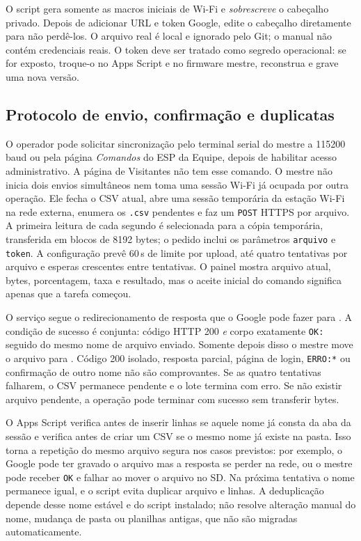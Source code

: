O script  gera somente as macros iniciais de Wi-Fi e \emph{sobrescreve} o cabeçalho privado. Depois de adicionar URL e token Google, edite o cabeçalho diretamente para não perdê-los. O arquivo real é local e ignorado pelo Git; o manual não contém credenciais reais. O token deve ser tratado como segredo operacional: se for exposto, troque-o no Apps Script e no firmware mestre, reconstrua e grave uma nova versão.

\subsection{Protocolo de envio, confirmação e duplicatas}\label{sec:google_fluxo}
O operador pode solicitar sincronização pelo terminal serial do mestre a 115200\,baud ou pela página \emph{Comandos} do ESP da Equipe, depois de habilitar acesso administrativo. A página de Visitantes não tem esse comando. O mestre não inicia dois envios simultâneos nem toma uma sessão Wi-Fi já ocupada por outra operação. Ele fecha o CSV atual, abre uma sessão temporária da estação Wi-Fi na rede externa, enumera os \texttt{.csv} pendentes e faz um \texttt{POST} HTTPS por arquivo. A primeira leitura de cada segundo é selecionada para a cópia temporária, transferida em blocos de 8192 bytes; o pedido inclui os parâmetros \texttt{arquivo} e \texttt{token}. A configuração prevê 60\,s de limite por upload, até quatro tentativas por arquivo e esperas crescentes entre tentativas. O painel mostra arquivo atual, bytes, porcentagem, taxa e resultado, mas o aceite inicial do comando significa apenas que a tarefa começou.

O serviço segue o redirecionamento de resposta que o Google pode fazer para . A condição de sucesso é conjunta: código HTTP 200 \emph{e} corpo exatamente \texttt{OK:} seguido do mesmo nome de arquivo enviado. Somente depois disso o mestre move o arquivo para . Código 200 isolado, resposta parcial, página de login, \texttt{ERRO:*} ou confirmação de outro nome não são comprovantes. Se as quatro tentativas falharem, o CSV permanece pendente e o lote termina com erro. Se não existir arquivo pendente, a operação pode terminar com sucesso sem transferir bytes.

O Apps Script verifica antes de inserir linhas se aquele nome já consta da aba da sessão e verifica antes de criar um CSV se o mesmo nome já existe na pasta. Isso torna a repetição do mesmo arquivo segura nos casos previstos: por exemplo, o Google pode ter gravado o arquivo mas a resposta se perder na rede, ou o mestre pode receber \texttt{OK} e falhar ao mover o arquivo no SD. Na próxima tentativa o nome permanece igual, e o script evita duplicar arquivo e linhas. A deduplicação depende desse nome estável e do script instalado; não resolve alteração manual do nome, mudança de pasta ou planilhas antigas, que não são migradas automaticamente.

